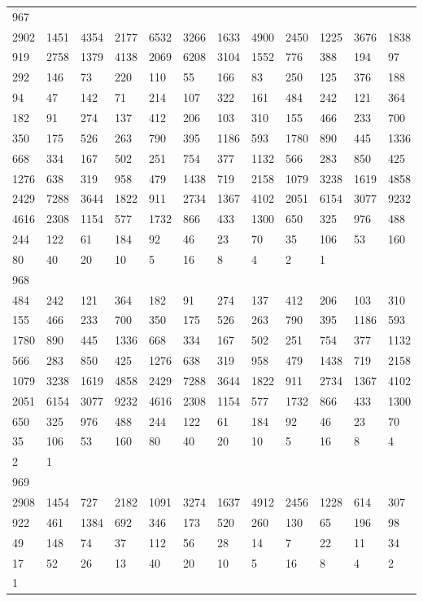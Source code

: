 \begin{longtable}{llllllllllll}
967&&&&&&&&&&&\\
2902& 1451& 4354& 2177& 6532& 3266& 1633& 4900& 2450& 1225& 3676& 1838\\
919& 2758& 1379& 4138& 2069& 6208& 3104& 1552& 776& 388& 194& 97\\
292& 146& 73& 220& 110& 55& 166& 83& 250& 125& 376& 188\\
94& 47& 142& 71& 214& 107& 322& 161& 484& 242& 121& 364\\
182& 91& 274& 137& 412& 206& 103& 310& 155& 466& 233& 700\\
350& 175& 526& 263& 790& 395& 1186& 593& 1780& 890& 445& 1336\\
668& 334& 167& 502& 251& 754& 377& 1132& 566& 283& 850& 425\\
1276& 638& 319& 958& 479& 1438& 719& 2158& 1079& 3238& 1619& 4858\\
2429& 7288& 3644& 1822& 911& 2734& 1367& 4102& 2051& 6154& 3077& 9232\\
4616& 2308& 1154& 577& 1732& 866& 433& 1300& 650& 325& 976& 488\\
244& 122& 61& 184& 92& 46& 23& 70& 35& 106& 53& 160\\
80& 40& 20& 10& 5& 16& 8& 4& 2& 1& \\

968&&&&&&&&&&&\\
484& 242& 121& 364& 182& 91& 274& 137& 412& 206& 103& 310\\
155& 466& 233& 700& 350& 175& 526& 263& 790& 395& 1186& 593\\
1780& 890& 445& 1336& 668& 334& 167& 502& 251& 754& 377& 1132\\
566& 283& 850& 425& 1276& 638& 319& 958& 479& 1438& 719& 2158\\
1079& 3238& 1619& 4858& 2429& 7288& 3644& 1822& 911& 2734& 1367& 4102\\
2051& 6154& 3077& 9232& 4616& 2308& 1154& 577& 1732& 866& 433& 1300\\
650& 325& 976& 488& 244& 122& 61& 184& 92& 46& 23& 70\\
35& 106& 53& 160& 80& 40& 20& 10& 5& 16& 8& 4\\
2& 1& \\

969&&&&&&&&&&&\\
2908& 1454& 727& 2182& 1091& 3274& 1637& 4912& 2456& 1228& 614& 307\\
922& 461& 1384& 692& 346& 173& 520& 260& 130& 65& 196& 98\\
49& 148& 74& 37& 112& 56& 28& 14& 7& 22& 11& 34\\
17& 52& 26& 13& 40& 20& 10& 5& 16& 8& 4& 2\\
1& \\


\end{longtable}
